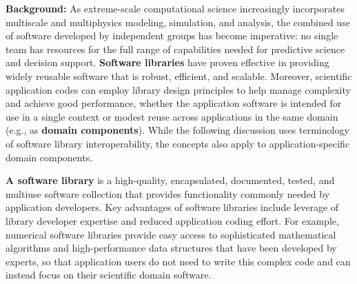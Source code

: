 \documentclass[]{article}
\date{}
\begin{document}
\pagestyle{fancy}
\renewcommand{\headrulewidth}{0pt}
  
\thispagestyle{empty}

\textbf{\newline \newline \newline Background:} As extreme-scale computational science increasingly
incorporates multiscale and multiphysics modeling, simulation, and
analysis, the combined use of software developed by independent groups
has become imperative: no single team has resources for the full range
of capabilities needed for predictive science and decision support.
\textbf{Software libraries} have proven effective in providing widely
reusable software that is robust, efficient, and scalable. Moreover,
scientific application codes can employ library design principles to
help manage complexity and achieve good performance, whether the
application software is intended for use in a single context or modest
reuse across applications in the same domain (e.g., as \textbf{domain
components}). While the following discussion uses terminology of
software library interoperability, the concepts also apply to
application-specific domain components.

\textbf{A software library} is a high-quality, encapsulated, documented,
tested, and multiuse software collection that provides functionality
commonly needed by application developers. Key advantages of software
libraries include leverage of library developer expertise and reduced
application coding effort. For example, numerical software libraries
provide easy access to sophisticated mathematical algorithms and
high-performance data structures that have been developed by experts, so
that application users do not need to write this complex code and can
instead focus on their scientific domain software.
\end{document}

